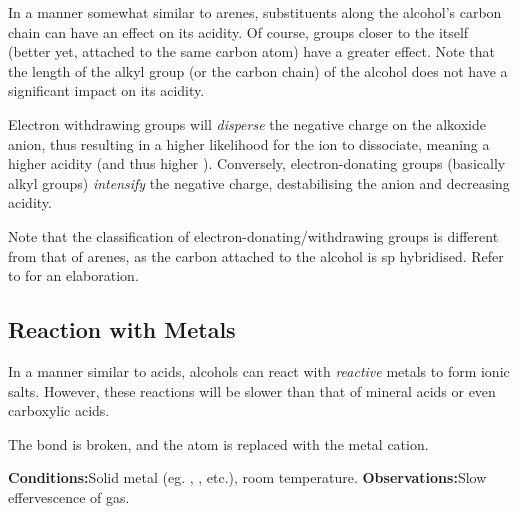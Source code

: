 				In a manner somewhat similar to arenes, substituents along the alcohol's carbon chain can have an effect on its acidity.
				Of course, groups closer to the  itself (better yet, attached to the same carbon atom) have a greater effect. Note
				that the length of the alkyl group (or the carbon chain) of the alcohol does not have a significant impact on its acidity.

				Electron withdrawing groups will \textit{disperse} the negative charge on the alkoxide anion, thus resulting in a higher
				likelihood for the  ion to dissociate, meaning a higher acidity (and thus higher \Ka). Conversely, electron-donating
				groups (basically alkyl groups) \textit{intensify} the negative charge, destabilising the anion and decreasing acidity.

				Note that the classification of electron-donating/withdrawing groups is different from that of arenes, as the carbon
				attached to the alcohol is sp hybridised. Refer to \hyperlink{CaveatResonanceTable}{} for an
				elaboration.



		\pagebreak
		\subsection{Reaction with Metals}

			In a manner similar to acids, alcohols can react with \textit{reactive} metals to form ionic salts. However, these reactions
			will be slower than that of mineral acids or even carboxylic acids.

			The  bond is broken, and the  atom is replaced with the metal cation.


			\vspace{1.5em}
			\vbox{\textbf{Conditions:}\tabto{35mm}Solid metal (eg. , , etc.), room temperature.}
			\vbox{\textbf{Observations:}\tabto{35mm}Slow effervescence of  gas.}


